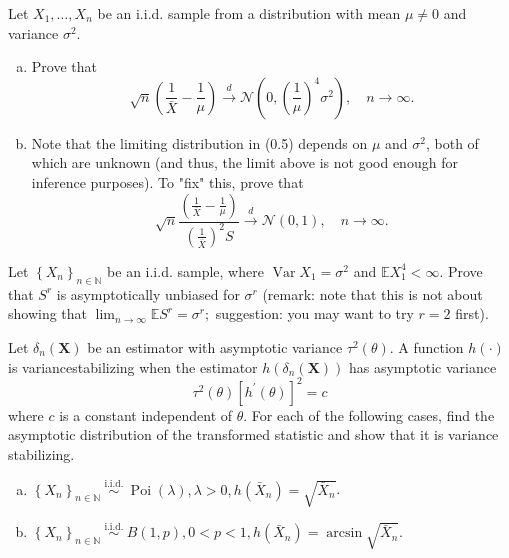 \begin{ex}
    Let \(X_{1}, \ldots, X_{n}\) be an i.i.d. sample from a distribution with mean \(\mu \neq 0\) and variance \(\sigma^{2}\). 
    \begin{enumerate}[(a)]
        \item Prove that
        \[
            \sqrt{n}\left(\frac{1}{\bar{X}}-\frac{1}{\mu}\right) \stackrel{d}{\rightarrow} \mathcal{N}\left(0,\left(\frac{1}{\mu}\right)^{4} \sigma^{2}\right), \quad n \rightarrow \infty. 
        \]
        \item Note that the limiting distribution in (0.5) depends on \(\mu\) and \(\sigma^{2}\), both of which are unknown (and thus, the limit above is not good enough for inference purposes). To "fix" this, prove that
        \[
            \sqrt{n} \frac{\left(\frac{1}{\bar{X}}-\frac{1}{\mu}\right)}{\left(\frac{1}{\bar{X}}\right)^{2} S} \stackrel{d}{\rightarrow} \mathcal{N}(0,1), \quad n \rightarrow \infty. 
        \]
    \end{enumerate}
\end{ex}

\begin{ex}
    Let \(\left\{X_{n}\right\}_{n \in \mathbb{N}}\) be an i.i.d. sample, where \(\operatorname{Var} X_{1}=\sigma^{2}\) and \(\mathbb{E} X_{1}^{4}<\infty\). Prove that \(S^{r}\) is asymptotically unbiased for \(\sigma^{r}\) (remark: note that this is not about showing that \(\lim _{n \rightarrow \infty} \mathbb{E} S^{r}=\sigma^{r} ;\) suggestion: you may want to try \(r=2\) first). 
\end{ex}

\begin{ex}
    Let \(\delta_{n}(\mathbf{X})\) be an estimator with asymptotic variance \(\tau^{2}(\theta)\). A function \(h(\cdot)\) is variancestabilizing when the estimator \(h\left(\delta_{n}(\mathbf{X})\right)\) has asymptotic variance
    \begin{equation}
        \label{eq:6.12}
        \tau^{2}(\theta)\left[h^{\prime}(\theta)\right]^{2}=c
    \end{equation}
    where \(c\) is a constant independent of \(\theta\). For each of the following cases, find the asymptotic distribution of the transformed statistic and show that it is variance stabilizing. 
    \begin{enumerate}[(a)]
        \item \(\left\{X_{n}\right\}_{n \in \mathbb{N}} \stackrel{\text { i.i.d. }}{\sim} \operatorname{Poi}(\lambda), \lambda>0, h\left(\bar{X}_{n}\right)=\sqrt{\bar{X}_{n}}\). 
        \item \(\left\{X_{n}\right\}_{n \in \mathbb{N}} \stackrel{\text { i.i.d. }}{\sim} B(1, p), 0<p<1, h\left(\bar{X}_{n}\right)=\arcsin \sqrt{\bar{X}_{n}}\). 
    \end{enumerate}
\end{ex}

